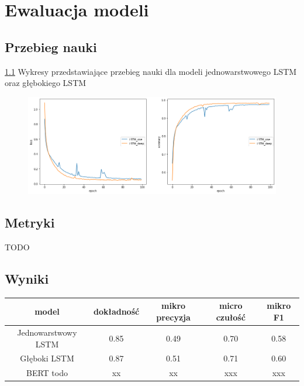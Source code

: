 \chapter{Ewaluacja modeli}

\section{Przebieg nauki}

\ref{rys:lstm_one_deep_comparison} Wykresy przedstawiające przebieg nauki dla modeli jednowarstwowego LSTM oraz głębokiego LSTM

\begin{figure}[t]
\centering\includegraphics[width=\textwidth]{figures/reports/lstm_one_deep_comparison.png}
\label{rys:lstm_one_deep_comparison}
\end{figure}

\section{Metryki}

TODO

\section{Wyniki}

\begin{table}[t]
\label{tab:tabela_results}
\centering\footnotesize%
\begin{tabular}{c c c c c}
\toprule
model & dokładność & mikro precyzja & micro czułość & mikro F1 \\
\midrule
Jednowarstwowy LSTM   & 0.85 & 0.49 & 0.70 & 0.58 \\
Głęboki LSTM   & 0.87 & 0.51 & 0.71 & 0.60 \\
BERT todo   & xx & xx & xxx & xxx \\
\bottomrule
\end{tabular}
\end{table}